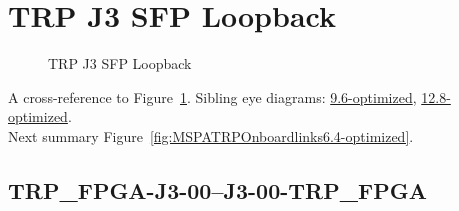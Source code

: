 

% 

\section{TRP J3 SFP Loopback}\label{sec:TRPJ3SFPLoopback6.4-optimized}

\begin{figure}[h] %
\begin{subfigure}{1\textwidth}
\hyperref[sec:TRPFPGAJ300J300TRPFPGA6.4-optimized]{}
\end{subfigure}

\caption{TRP J3 SFP Loopback} \label{fig:TRPJ3SFPLoopback6.4-optimized}
\end{figure}

A cross-reference to Figure~\ref{fig:TRPJ3SFPLoopback6.4-optimized}.
Sibling eye diagrams: \hyperref[sec:TRPJ3SFPLoopback9.6-optimized]{9.6-optimized}, \hyperref[sec:TRPJ3SFPLoopback12.8-optimized]{12.8-optimized}. \\
Next summary Figure~\ref{fig:MSPATRPOnboardlinks6.4-optimized}.
\clearpage
% 
\subsection{TRP\_FPGA-J3-00--J3-00-TRP\_FPGA}\label{sec:TRPFPGAJ300J300TRPFPGA6.4-optimized}

